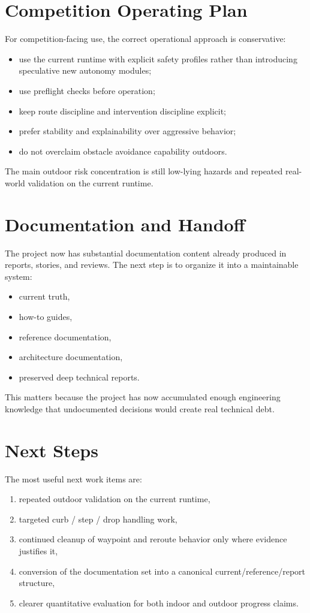 \documentclass[11pt]{article}
\begin{document}
\section{Competition Operating Plan}
For competition-facing use, the correct operational approach is conservative:
\begin{itemize}[leftmargin=*]
  \item use the current runtime with explicit safety profiles rather than introducing speculative new autonomy modules;
  \item use preflight checks before operation;
  \item keep route discipline and intervention discipline explicit;
  \item prefer stability and explainability over aggressive behavior;
  \item do not overclaim obstacle avoidance capability outdoors.
\end{itemize}

The main outdoor risk concentration is still low-lying hazards and repeated real-world validation on the current runtime.

\section{Documentation and Handoff}
The project now has substantial documentation content already produced in reports, stories, and reviews. The next step is to organize it into a maintainable system:
\begin{itemize}[leftmargin=*]
  \item current truth,
  \item how-to guides,
  \item reference documentation,
  \item architecture documentation,
  \item preserved deep technical reports.
\end{itemize}

This matters because the project has now accumulated enough engineering knowledge that undocumented decisions would create real technical debt.

\section{Next Steps}
The most useful next work items are:
\begin{enumerate}[leftmargin=*]
  \item repeated outdoor validation on the current runtime,
  \item targeted curb / step / drop handling work,
  \item continued cleanup of waypoint and reroute behavior only where evidence justifies it,
  \item conversion of the documentation set into a canonical current/reference/report structure,
  \item clearer quantitative evaluation for both indoor and outdoor progress claims.
\end{enumerate}
\end{document}
